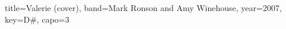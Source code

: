 \documentclass{bekki-leadsheet}
\begin{document}
\begin{song}[transpose-capo=true]{title={Valerie (cover)}, band={Mark Ronson and Amy Winehouse}, year={2007}, key={D#}, capo={3}}



\end{song}
\end{document}
